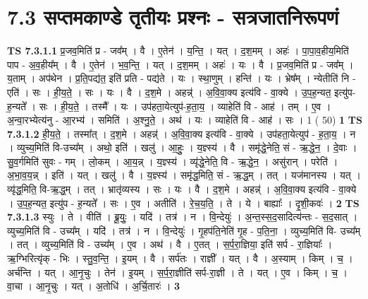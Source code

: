 \documentclass[17pt]{extarticle}
\begin{document}
\section*{ 7.3      सप्तमकाण्डे तृतीयः प्रश्नः - सत्रजातनिरूपणं }
                                \textbf{ TS 7.3.1.1} \newline
                  प्र॒जव॒मिति॑ प्र - जव᳚म् । वै । ए॒तेन॑ । य॒न्ति॒ । यत् । द॒श॒मम् । अहः॑ । पा॒पा॒व॒हीय॒मिति॑ पाप - अ॒व॒हीय᳚म् । वै । ए॒तेन॑ । भ॒व॒न्ति॒ । यत् । द॒श॒मम् । अहः॑ । यः । वै । प्र॒जव॒मिति॑ प्र - जव᳚म् । य॒ताम् । अप॑थेन । प्र॒ति॒पद्य॑त॒ इति॑ प्रति - पद्य॑ते । यः । स्था॒णुम् । हन्ति॑ । यः । भ्रेष᳚म् । न्येतीति॑ नि - एति॑ । सः । ही॒य॒ते॒ । सः । यः । वै । द॒श॒मे । अहन्न्॑ । अ॒वि॒वा॒क्य इत्य॑वि - वा॒क्ये । उ॒प॒ह॒न्यत॒ इत्यु॑प-ह॒न्यते᳚ । सः । ही॒य॒ते॒ । तस्मै᳚ । यः । उप॑हता॒येत्युप॑-ह॒ता॒य॒ । व्याहेति॑ वि - आह॑ । तम् । ए॒व । अ॒न्वा॒रभ्येत्य॑नु - आ॒रभ्य॑ । समिति॑ । अ॒श्नु॒ते॒ । अथ॑ । यः । व्याहेति॑ वि - आह॑ । सः । 1 ( 50) \textbf{  1} \newline
                  \newline
                                \textbf{ TS 7.3.1.2} \newline
                  ही॒य॒ते॒ । तस्मा᳚त् । द॒श॒मे । अहन्न्॑ । अ॒वि॒वा॒क्य इत्य॑वि - वा॒क्ये । उप॑हता॒येत्युप॑ - ह॒ता॒य॒ । न । व्युच्य॒मिति॑ वि-उच्य᳚म् । अथो॒ इति॑ । खलु॑ । आ॒हुः॒ । य॒ज्ञ्स्य॑ । वै । समृ॑द्धे॒नेति॒ सं - ऋ॒द्धे॒न॒ । दे॒वाः । सु॒व॒र्गमिति॑ सुवः - गम् । लो॒कम् । आ॒य॒न्न् । य॒ज्ञ्स्य॑ । व्यृ॑द्धे॒नेति॒ वि - ऋ॒द्धे॒न॒ । असु॑रान् । परेति॑ । अ॒भा॒व॒य॒न्न् । इति॑ । यत् । खलु॑ । वै । य॒ज्ञ्स्य॑ । समृ॑द्ध॒मिति॒ सं - ऋ॒द्ध॒म् । तत् । यज॑मानस्य । यत् । व्यृ॑द्ध॒मिति॒ वि-ऋ॒द्ध॒म् । तत् । भ्रातृ॑व्यस्य । सः । यः । वै । द॒श॒मे । अहन्न्॑ । अ॒वि॒वा॒क्य इत्य॑वि - वा॒क्ये । उ॒प॒ह॒न्यत॒ इत्यु॑प - ह॒न्यते᳚ । सः । ए॒व । अतीति॑ । रे॒च॒य॒ति॒ । ते । ये । बाह्याः᳚ । दृ॒शी॒कवः॑ । \textbf{  2} \newline
                  \newline
                                \textbf{ TS 7.3.1.3} \newline
                  स्युः । ते । वीति॑ । ब्रू॒युः॒ । यदि॑ । तत्र॑ । न । वि॒न्देयुः॑ । अ॒न्त॒स्स॒द॒सादित्य॑न्तः - स॒द॒सात् । व्युच्य॒मिति॑ वि - उच्य᳚म् । यदि॑ । तत्र॑ । न । वि॒न्देयुः॑ । गृ॒हप॑ति॒नेति॑ गृ॒ह - प॒ति॒ना॒ । व्युच्य॒मिति॑ वि- उच्य᳚म् । तत् । व्युच्य॒मिति॑ वि - उच्य᳚म् । ए॒व । अथ॑ । वै । ए॒तत् । स॒र्प॒रा॒ज्ञिया॒ इति॑ सर्प - रा॒ज्ञियाः᳚ । ऋ॒ग्भिरित्यृ॑क् - भिः । स्तु॒व॒न्ति॒ । इ॒यम् । वै । सर्प॑तः । राज्ञी᳚ । यत् । वै । अ॒स्याम् । किम् । च॒ । अर्च॑न्ति । यत् । आ॒नृ॒चुः । तेन॑ । इ॒यम् । स॒र्प॒रा॒ज्ञीति॑ सर्प-रा॒ज्ञी । ते । यत् । ए॒व । किम् । च॒ । वा॒चा । आ॒नृ॒चुः । यत् । अ॒तोधि॑ । अ॒र्चि॒तारः॑ । \textbf{  3} \newline
\end{document}
